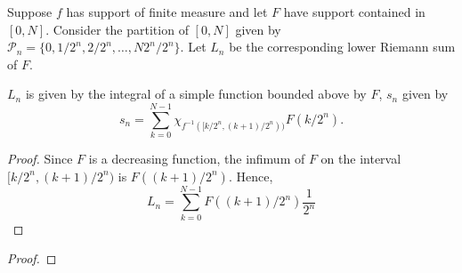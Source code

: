 \documentclass{unswmaths}
\begin{document}
Suppose $f$ has support of finite measure and let $F$ have support contained in $[0,N]$. 
Consider the partition of $[0,N]$ given by $\mathcal{P}_n = \{0,1/2^n,2/2^n,\ldots,N2^n/2^n\}$.
Let $L_n$ be the corresponding lower Riemann sum of $F$.

\begin{lemma}
    $L_n$ is given by the integral of a simple function bounded above by $F$, $s_n$
    given by
    \begin{equation*}
        s_n = \sum_{k=0}^{N-1} \chi_{f^{-1}([k/2^n,(k+1)/2^n))} F(k/2^n).
    \end{equation*}
\end{lemma}
\begin{proof}
    Since $F$ is a decreasing function, the infimum of $F$ on the interval $[k/2^n,(k+1)/2^n)$
    is $F((k+1)/2^n)$.
    Hence,
    \begin{equation*}
        L_n = \sum_{k=0}^{N-1} F((k+1)/2^n)\frac{1}{2^n}
    \end{equation*}
    
    
    
\end{proof}
\begin{proof}
    
\end{proof}
\end{document}
